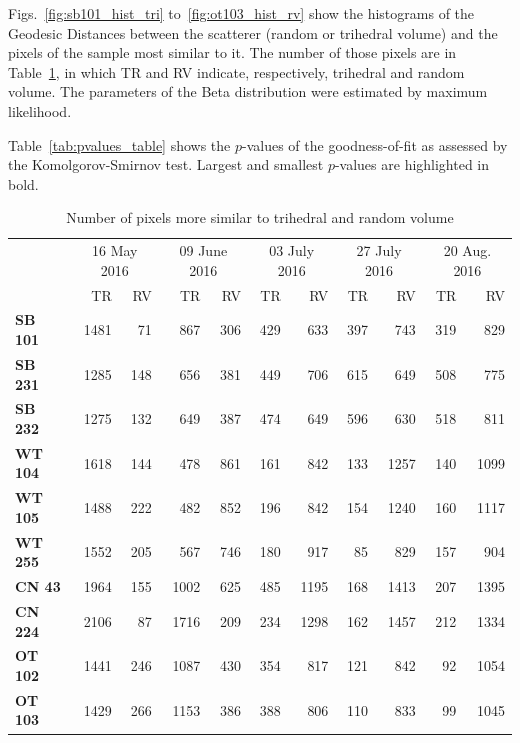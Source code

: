\documentclass[12pt]{article}
\begin{document}
Figs.~\ref{fig:sb101_hist_tri} to~\ref{fig:ot103_hist_rv} show the histograms of the Geodesic Distances between the scatterer (random or trihedral volume) and the pixels of the sample most similar to it.
The number of those pixels are in Table~\ref{tab:size_sample}, in which TR and RV indicate, respectively, trihedral and random volume.
The parameters of the Beta distribution were estimated by maximum likelihood.

Table~\ref{tab:pvalues_table} shows the $p$-values of the goodness-of-fit as assessed by the Komolgorov-Smirnov test.
Largest and smallest $p$-values are highlighted in bold.

\begin{table}[hbt]
  \centering
  \caption{Number of pixels more similar to trihedral and random volume}
  \label{tab:size_sample}
  \begin{tabular}{lrrrrrrrrrr}
    \toprule
    & \multicolumn{2}{c}{16 May 2016} & \multicolumn{2}{c}{09 June 2016} & \multicolumn{2}{c}{03 July 2016} & \multicolumn{2}{c}{27 July 2016} & \multicolumn{2}{c}{20 Aug. 2016}\\
    & TR & RV & TR & RV & TR & RV & TR & RV& TR & RV\\
    \cmidrule(lr){2-11}
    \textbf{SB 101} & 1481 & 71 & 867 & 306 & 429 & 633 & 397 & 743 & 319 & 829\\
    \textbf{SB 231} & 1285 & 148 & 656 & 381 & 449 & 706 & 615 & 649 & 508 & 775\\
    \textbf{SB 232} & 1275 & 132 & 649 & 387 & 474 & 649 & 596 & 630 & 518 & 811\\
    \textbf{WT 104} & 1618 & 144 & 478 & 861 & 161 & 842 & 133 & 1257 & 140 & 1099\\
    \textbf{WT 105} & 1488 & 222 & 482 & 852 & 196 & 842 & 154 & 1240 & 160 & 1117\\
    \textbf{WT 255} & 1552 & 205 & 567 & 746 & 180 & 917 & 85 & 829 & 157 & 904\\
    \textbf{CN 43}  & 1964 & 155 & 1002 & 625 & 485 & 1195 & 168 & 1413 & 207 & 1395\\
    \textbf{CN 224} & 2106 & 87 & 1716 & 209 & 234 & 1298 & 162 & 1457 & 212 & 1334\\
    \textbf{OT 102} & 1441 & 246 & 1087 & 430 & 354 & 817 & 121 & 842 & 92 & 1054\\
    \textbf{OT 103} & 1429 & 266 & 1153 & 386 & 388 & 806 & 110 & 833 & 99 & 1045\\
    \bottomrule
  \end{tabular}
\end{table}
\end{document}
